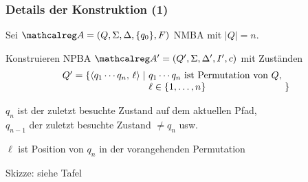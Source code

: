 \begin{frame}
  \frametitle{Details der Konstruktion (1)}

  Sei $\Aut{A} = (Q,\Sigma,\Delta,\{q_0\},F)$ NMBA mit $|Q|=n$.
  \par\smallskip
  Konstruieren NPBA $\Aut{A}' = (Q',\Sigma,\Delta',I',c)$ mit Zuständen
  \[
    \begin{array}{@{}l@{~}l@{~}l}
      Q' = \{\auf q_1\cdots q_n,\,\ell\zu \mid & q_1\cdots q_n \text{ ist Permutation von $Q$}, &    \\
                                               & \ell \in \{1,\dots,n\}                         & \}
    \end{array}
  \]

  \begin{Itemize}
    \item
      $q_n$ ist der zuletzt besuchte Zustand auf dem aktuellen Pfad,\\
      $q_{n-1}$ der zuletzt besuchte Zustand $\neq q_n$ usw.
    \item
      $\ell$ ist Position von $q_n$ in der vorangehenden Permutation
  \end{Itemize}

  \par\smallskip
  Skizze: siehe Tafel \Tafel

\end{frame}

